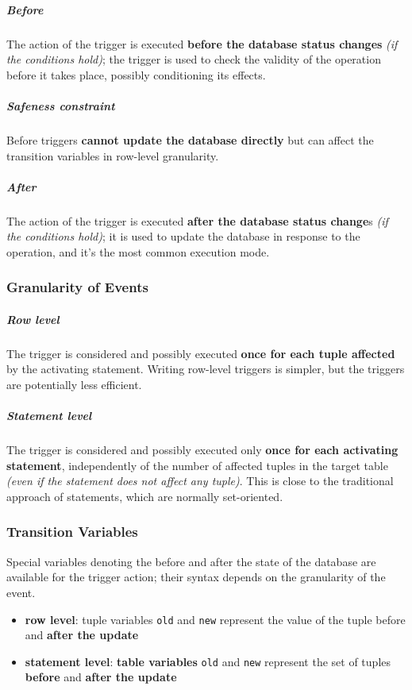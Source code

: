 \documentclass[english]{article}
\begin{document}
\subparagraph*{Before}
The action of the trigger is executed \textbf{before the database status changes} \textit{(if the conditions hold)};
the trigger is used to check the validity of the operation before it takes place, possibly conditioning its effects.

\subparagraph*{Safeness constraint} Before triggers \textbf{cannot update the database directly} but can affect the transition variables in row-level granularity.

\subparagraph*{After}

The action of the trigger is executed \textbf{after the database status change}s \textit{(if the conditions hold)};
it is used to update the database in response to the operation, and it's the most common execution mode.

\subsubsection{Granularity of Events}

\subparagraph*{Row level}
The trigger is considered and possibly executed \textbf{once for each tuple affected} by the activating statement.
Writing row-level triggers is simpler, but the triggers are potentially less efficient.

\subparagraph*{Statement level}
The trigger is considered and possibly executed only \textbf{once for each activating statement}, independently of the number of affected tuples in the target table \textit{(even if the statement does not affect any tuple)}.
This is close to the traditional approach of \sql statements, which are normally set-oriented.

\subsubsection{Transition Variables}

Special variables denoting the before and after the state of the database are available for the trigger action;
their syntax depends on the granularity of the event.

\begin{itemize}
  \item \textbf{row level}: tuple variables \texttt{old} and \texttt{new} represent the value of the tuple before and \textbf{after the update}
  \item \textbf{statement level}: \textbf{table variables} \texttt{old} and \texttt{new} represent the set of tuples \textbf{before} and \textbf{after the update}
\end{itemize}
\end{document}
